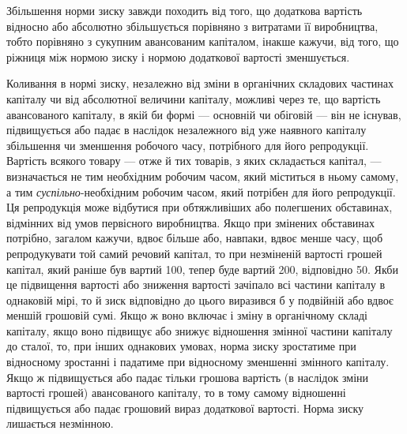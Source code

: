 
Збільшення норми зиску завжди походить від того, що додаткова
вартість відносно або абсолютно збільшується порівняно
з витратами її виробництва, тобто порівняно з сукупним авансованим
капіталом, інакше кажучи, від того, що ріжниця між
нормою зиску і нормою додаткової вартості зменшується.

Коливання в нормі зиску, незалежно від зміни в органічних
складових частинах капіталу чи від абсолютної величини капіталу,
можливі через те, що вартість авансованого капіталу,
в якій би формі — основній чи обіговій — він не існував,
підвищується або падає в наслідок незалежного від уже наявного
капіталу збільшення чи зменшення робочого часу, потрібного
для його репродукції. Вартість всякого товару — отже
й тих товарів, з яких складається капітал, — визначається не
тим необхідним робочим часом, який міститься в ньому самому,
а тим \emph{суспільно}-необхідним робочим часом, який потрібен для
його репродукції. Ця репродукція може відбутися при обтяжливіших
або полегшених обставинах, відмінних від умов первісного
виробництва. Якщо при змінених обставинах потрібно,
загалом кажучи, вдвоє більше або, навпаки, вдвоє менше часу,
щоб репродукувати той самий речовий капітал, то при незміненій
вартості грошей капітал, який раніше був вартий 100, тепер буде вартий 200, відповідно
50. Якби це підвищення вартості або
зниження вартості зачіпало всі частини капіталу в однаковій
мірі, то й зиск відповідно до цього виразився б у подвійній
або вдвоє меншій грошовій сумі. Якщо ж воно включає і зміну
в органічному складі капіталу, якщо воно підвищує або знижує
відношення змінної частини капіталу до сталої, то, при інших
однакових умовах, норма зиску зростатиме при відносному
зростанні і падатиме при відносному зменшенні змінного капіталу.
Якщо ж підвищується або падає тільки грошова вартість
(в наслідок зміни вартості грошей) авансованого капіталу, то
в тому самому відношенні підвищується або падає грошовий вираз
додаткової вартості. Норма зиску лишається незмінною.
